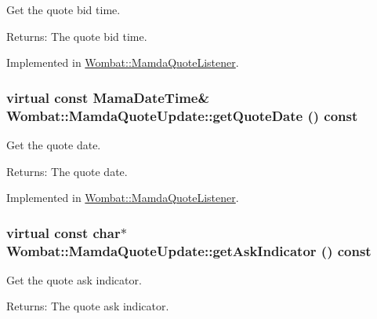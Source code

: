 Get the quote bid time. 

\begin{Desc}
\item[Returns:]The quote bid time. \end{Desc}


Implemented in \hyperlink{classWombat_1_1MamdaQuoteListener_467043c393ad5906990c6c90c777e56b}{Wombat::Mamda\-Quote\-Listener}.\hypertarget{classWombat_1_1MamdaQuoteUpdate_d02f980bc64ca03a40fa5df13acf43d3}{
\subsubsection[getQuoteDate]{\setlength{\rightskip}{0pt plus 5cm}virtual const Mama\-Date\-Time\& Wombat::Mamda\-Quote\-Update::get\-Quote\-Date () const}}
\label{classWombat_1_1MamdaQuoteUpdate_d02f980bc64ca03a40fa5df13acf43d3}


Get the quote date. 

\begin{Desc}
\item[Returns:]The quote date. \end{Desc}


Implemented in \hyperlink{classWombat_1_1MamdaQuoteListener_b7fa56da5969989fe36247d8e8d32f3f}{Wombat::Mamda\-Quote\-Listener}.\hypertarget{classWombat_1_1MamdaQuoteUpdate_d4aef78f84d2c31db345e147fcf6ca4c}{
\subsubsection[getAskIndicator]{\setlength{\rightskip}{0pt plus 5cm}virtual const char$\ast$ Wombat::Mamda\-Quote\-Update::get\-Ask\-Indicator () const}}
\label{classWombat_1_1MamdaQuoteUpdate_d4aef78f84d2c31db345e147fcf6ca4c}


Get the quote ask indicator. 

\begin{Desc}
\item[Returns:]The quote ask indicator. \end{Desc}


